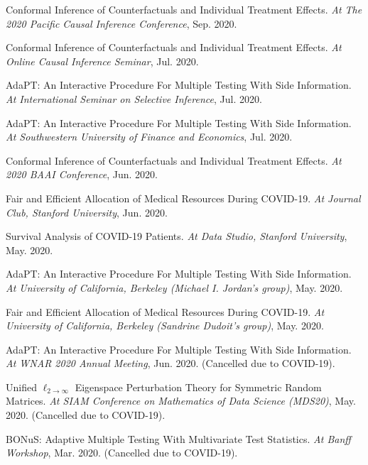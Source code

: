 \documentclass{article}
\begin{document}
\vspace{2mm}
Conformal Inference of Counterfactuals and Individual Treatment Effects. \emph{At The 2020 Pacific Causal Inference Conference}, Sep. 2020.

\vspace{2mm}
Conformal Inference of Counterfactuals and Individual Treatment Effects. \emph{At Online Causal Inference Seminar}, Jul. 2020.

\vspace{2mm}
AdaPT: An Interactive Procedure For Multiple Testing With Side Information. \emph{At International Seminar on Selective Inference}, Jul. 2020. 

\vspace{2mm}
AdaPT: An Interactive Procedure For Multiple Testing With Side Information. \emph{At Southwestern University of Finance and Economics}, Jul. 2020. 

\vspace{2mm}
Conformal Inference of Counterfactuals and Individual Treatment Effects. \emph{At 2020 BAAI Conference}, Jun. 2020. 

\vspace{2mm}
Fair and Efficient Allocation of Medical Resources During COVID-19. \emph{At Journal Club, Stanford University}, Jun. 2020.

\vspace{2mm}
Survival Analysis of COVID-19 Patients. \emph{At Data Studio, Stanford University}, May. 2020.

\vspace{2mm}
AdaPT: An Interactive Procedure For Multiple Testing With Side Information. \emph{At University of California, Berkeley (Michael I. Jordan's group)}, May. 2020. 

\vspace{2mm}
Fair and Efficient Allocation of Medical Resources During COVID-19. \emph{At University of California, Berkeley (Sandrine Dudoit's group)}, May. 2020. 

\vspace{2mm}
AdaPT: An Interactive Procedure For Multiple Testing With Side Information. \emph{At WNAR 2020 Annual Meeting}, Jun. 2020. (Cancelled due to COVID-19).

\vspace{2mm}
Unified $\ell_{2\rightarrow\infty}$ Eigenspace Perturbation Theory for Symmetric Random Matrices. \emph{At SIAM Conference on Mathematics of Data Science (MDS20)}, May. 2020. (Cancelled due to COVID-19).

\vspace{2mm}
BONuS: Adaptive Multiple Testing With Multivariate Test Statistics. \emph{At Banff Workshop}, Mar. 2020. (Cancelled due to COVID-19).
\end{document}
